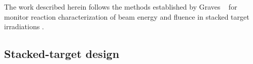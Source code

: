 The work described herein follows the  methods established by Graves \etal\ 
for monitor reaction characterization of beam energy and fluence in stacked target irradiations \cite{Graves2016}.



\subsection{Stacked-target design }\label{sec:target_design}


